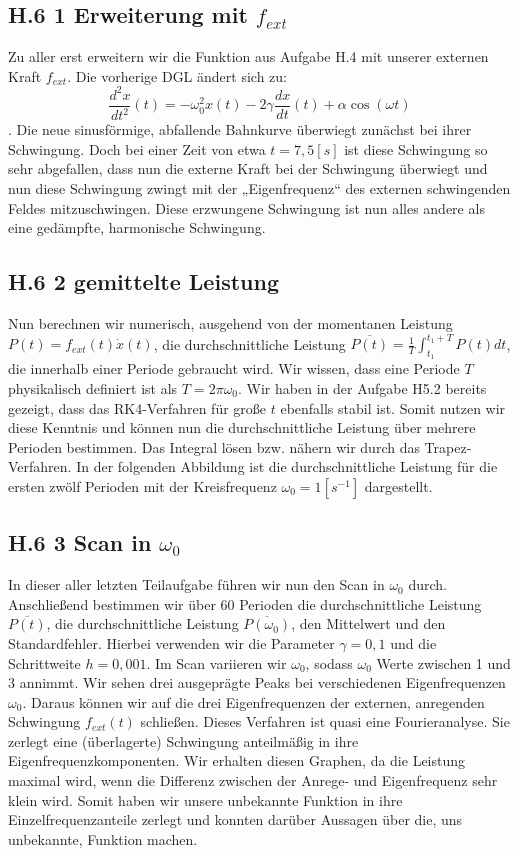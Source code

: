 \documentclass[ngerman]{scrartcl}
\begin{document}
\subsection{H.6 1 Erweiterung mit $f_{ext}$}
Zu aller erst erweitern wir die Funktion aus Aufgabe H.4 mit unserer externen Kraft $f_{ext}$. Die vorherige DGL ändert sich zu: \begin{equation}  \frac{d^2x}{dt^2}(t) = -\omega_0^2x(t) - 2\gamma\frac{dx}{dt}(t) + \alpha\cos(\omega t)  \end{equation}. Die neue sinusförmige, abfallende Bahnkurve überwiegt zunächst bei ihrer Schwingung. Doch bei einer Zeit von etwa $t=7,5[s]$ ist diese Schwingung so sehr abgefallen, dass nun die externe Kraft bei der Schwingung überwiegt und nun diese Schwingung zwingt mit der „Eigenfrequenz“ des externen schwingenden Feldes mitzuschwingen. Diese erzwungene Schwingung ist nun alles andere als eine gedämpfte, harmonische Schwingung. 
\subsection{H.6 2 gemittelte Leistung}
Nun berechnen wir numerisch, ausgehend von der momentanen Leistung $P(t) = f_{ext}(t)\dot{x}(t)$,  die durchschnittliche Leistung $\overline{P(t)} = \frac{1}{T}\int_{t_1}^{t_1+T}P(t)dt$, die innerhalb einer Periode gebraucht wird. Wir wissen, dass eine Periode $T$ physikalisch definiert ist als $T = 2\pi\omega_0$. Wir haben in der Aufgabe H5.2 bereits gezeigt, dass das RK4-Verfahren für große $t$ ebenfalls stabil ist. Somit nutzen wir diese Kenntnis und können nun die durchschnittliche Leistung über mehrere Perioden bestimmen. Das Integral lösen bzw. nähern wir durch das Trapez-Verfahren. In der folgenden Abbildung ist die durchschnittliche Leistung für die ersten zwölf Perioden mit der Kreisfrequenz $\omega_0=1 [s^{-1}]$ dargestellt. 
\subsection{H.6 3 Scan in $\omega_0$}
In dieser aller letzten Teilaufgabe führen wir nun den Scan in $\omega_0$ durch. Anschließend bestimmen wir über 60 Perioden  die durchschnittliche Leistung $\overline{P(t)}$, die durchschnittliche Leistung $\overline{P(\omega_0)}$, den Mittelwert und den Standardfehler. Hierbei verwenden wir die Parameter $\gamma=0,1$ und die Schrittweite $h=0,001$. Im Scan variieren wir $\omega_0$, sodass $\omega_0$ Werte zwischen 1 und 3 annimmt.  
Wir sehen drei ausgeprägte Peaks bei verschiedenen Eigenfrequenzen $\omega_0$. Daraus können wir auf die drei Eigenfrequenzen der externen, anregenden Schwingung $f_{ext}(t)$  schließen. Dieses Verfahren ist quasi eine Fourieranalyse. Sie zerlegt eine (überlagerte) Schwingung anteilmäßig in ihre Eigenfrequenzkomponenten. Wir erhalten diesen Graphen, da die Leistung maximal wird, wenn die Differenz zwischen der Anrege- und Eigenfrequenz sehr klein wird. Somit haben wir unsere unbekannte Funktion in ihre Einzelfrequenzanteile zerlegt und konnten darüber Aussagen über die, uns unbekannte, Funktion machen.
\end{document}
